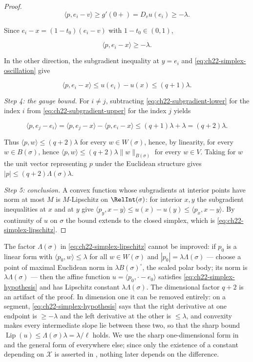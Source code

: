 \begin{proof}
\[
 \langle p,e_i-v\rangle\geq g'(0+)=D_vu(e_i)\geq-\lambda .
\]

Since $e_i-x=(1-t_0)(e_i-v)$ with $1-t_0\in(0,1)$,

\[
 \langle p,e_i-x\rangle\geq-\lambda .
\tag{22.15}\label{eq:ch22-subgradient-lower}
\]

In the other direction, the subgradient inequality at $y=e_i$ and
\eqref{eq:ch22-simplex-oscillation} give

\[
 \langle p,e_i-x\rangle\leq u(e_i)-u(x)\leq(q+1)\lambda .
\tag{22.16}\label{eq:ch22-subgradient-upper}
\]

\emph{Step 4: the gauge bound.}  For $i\neq j$, subtracting
\eqref{eq:ch22-subgradient-lower} for the index $i$ from
\eqref{eq:ch22-subgradient-upper} for the index $j$ yields

\[
 \langle p,e_j-e_i\rangle
   =\langle p,e_j-x\rangle-\langle p,e_i-x\rangle
   \leq(q+1)\lambda+\lambda=(q+2)\lambda .
\tag{22.17}\label{eq:ch22-subgradient-edges}
\]

Thus $\langle p,w\rangle\leq(q+2)\lambda$ for every $w\in W(\sigma)$,
hence, by linearity, for every $w\in B(\sigma)$, hence
$\langle p,w\rangle\leq(q+2)\lambda\|w\|_{B(\sigma)}$ for every
$w\in V$.  Taking for $w$ the unit vector representing $p$ under the
Euclidean structure gives
$|p|\leq(q+2)\Lambda(\sigma)\lambda$.

\emph{Step 5: conclusion.}  A convex function whose subgradients at interior
points have norm at most $M$ is $M$-Lipschitz on $\RelInt(\sigma)$:
for interior $x,y$ the subgradient inequalities at $x$ and at $y$ give
$\langle p_y,x-y\rangle\leq u(x)-u(y)\leq\langle p_x,x-y\rangle$.  By
continuity of $u$ on $\sigma$ the bound extends to the closed simplex,
which is \eqref{eq:ch22-simplex-lipschitz}.
\end{proof}

\begin{remark}
\label{rem:ch22-simplex-constant}
The factor $\Lambda(\sigma)$ in
\eqref{eq:ch22-simplex-lipschitz} cannot be improved: if $p_0$ is a linear
form with $\langle p_0,w\rangle\leq\lambda$ for all $w\in W(\sigma)$ and
$|p_0|=\lambda\Lambda(\sigma)$ --- choose a point of maximal Euclidean
norm in $\lambda B(\sigma)^\circ$, the scaled polar body; its norm is
$\lambda\Lambda(\sigma)$ --- then the affine function
$u=\langle p_0,\cdot-e_0\rangle$ satisfies
\eqref{eq:ch22-simplex-hypothesis} and has Lipschitz constant
$\lambda\Lambda(\sigma)$.  The dimensional factor $q+2$ is an artifact
of the proof.  In dimension one it can be removed entirely: on a segment,
\eqref{eq:ch22-simplex-hypothesis} says that the right derivative at one
endpoint is $\geq-\lambda$ and the left derivative at the other is
$\leq\lambda$, and convexity makes every intermediate slope lie between
these two, so that the sharp bound
$\operatorname{Lip}(u)\leq\Lambda(\sigma)\lambda=\lambda/\ell$ holds.  We
use the sharp one-dimensional form in
 and the general form of
 everywhere else; since only the existence of a
constant depending on $\mathcal X$ is asserted in
, nothing later depends on the
difference.
\end{remark}

